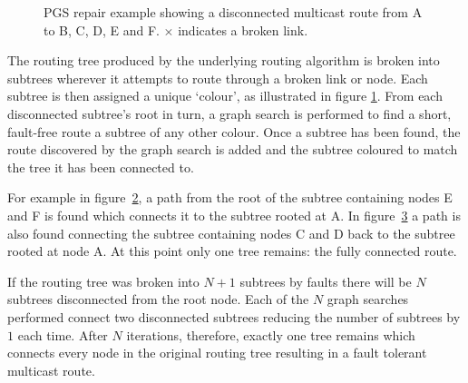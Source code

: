 		\begin{figure}
			\center
			\begin{subfigure}{0.32\linewidth}
				\hspace*{-1.5em}
				
				\caption{}
				\label{fig:pgs-repair-colouring}
			\end{subfigure}
			\begin{subfigure}{0.32\linewidth}
				\hspace*{-1.5em}
				
				\caption{}
				\label{fig:pgs-repair-colouring-fix1}
			\end{subfigure}
			\begin{subfigure}{0.32\linewidth}
				\hspace*{-1.5em}
				
				\caption{}
				\label{fig:pgs-repair-colouring-fix2}
			\end{subfigure}
			
			\caption{PGS repair example showing a disconnected multicast route from A
			to B, C, D, E and F. {\color{red}$\times$} indicates a broken link.}
			\label{fig:pgs-repair-colouring-steps}
		\end{figure}
		
		The routing tree produced by the underlying routing algorithm is broken
		into subtrees wherever it attempts to route through a broken link or node.
		Each subtree is then assigned a unique `colour', as illustrated in figure
		\ref{fig:pgs-repair-colouring}. From each disconnected subtree's root in
		turn, a graph search is performed to find a short, fault-free route a
		subtree of any other colour. Once a subtree has been found, the route
		discovered by the graph search is added and the subtree coloured to match
		the tree it has been connected to.
		
		For example in figure~\ref{fig:pgs-repair-colouring-fix1}, a path from the
		root of the subtree containing nodes E and F is found which connects it to
		the subtree rooted at A. In figure~\ref{fig:pgs-repair-colouring-fix2} a
		path is also found connecting the subtree containing nodes C and D back to
		the subtree rooted at node A. At this point only one tree remains: the
		fully connected route.
		
		If the routing tree was broken into $N+1$ subtrees by faults there will be
		$N$ subtrees disconnected from the root node. Each of the $N$ graph
		searches performed connect two disconnected subtrees reducing the number of
		subtrees by $1$ each time. After $N$ iterations, therefore, exactly one
		tree remains which connects every node in the original routing tree
		resulting in a fault tolerant multicast route.
		
